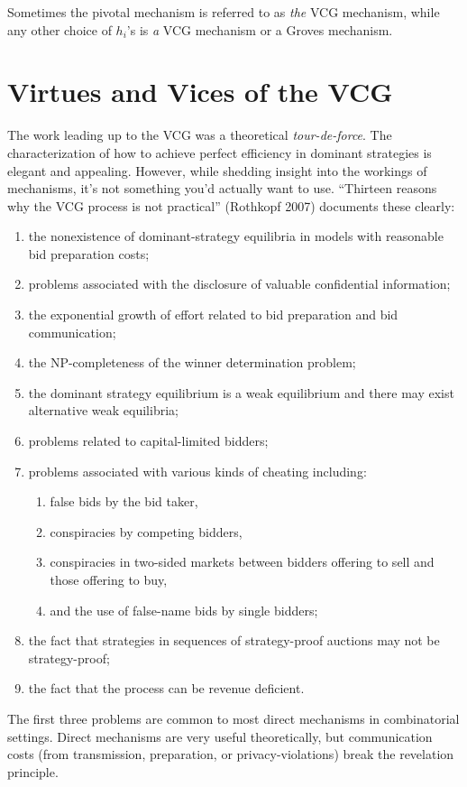 \documentclass[letter, 10pt]{article}
\theoremstyle{definition}
\begin{document}
\begin{spacing}{1.1}
Sometimes the pivotal mechanism is referred to as \emph{the} VCG mechanism,
while any other choice of $h_i$'s is \emph{a} VCG mechanism or a Groves
mechanism.

\section{Virtues and Vices of the VCG}
\label{sec:virtues-vcg}

The work leading up to the VCG was a theoretical
\emph{tour-de-force}. The characterization of how to achieve
perfect efficiency in dominant strategies is elegant and
appealing. However, while shedding insight into the workings of mechanisms,
it's not something you'd actually want to use. ``Thirteen reasons why the
VCG process is not practical'' (Rothkopf 2007) documents these clearly:
\begin{enumerate}
\item the nonexistence of dominant-strategy equilibria in models with reasonable bid preparation costs;
\item problems associated with the disclosure of valuable confidential
  information;
\item the exponential growth of effort related to bid preparation and bid
  communication;
\item the NP-completeness of the winner determination problem;
\item the dominant strategy equilibrium is a weak equilibrium and there may
  exist alternative weak equilibria;
\item problems related to capital-limited bidders;
\item problems associated with various kinds of cheating
  including:
  \begin{enumerate}
  \item false bids by the bid taker,
  \item conspiracies by competing bidders,
  \item conspiracies in two-sided markets between bidders offering
    to sell and those offering to buy,
  \item  and the use of false-name bids by single bidders;
  \end{enumerate}
\item the fact that strategies in sequences of strategy-proof auctions may
  not be strategy-proof;
\item the fact that the process can be revenue deficient.
\end{enumerate}
The first three problems are common to most direct mechanisms in
combinatorial settings. Direct mechanisms are very useful theoretically,
but communication costs (from transmission, preparation, or
privacy-violations) break the revelation principle.


\end{spacing}
\end{document}
